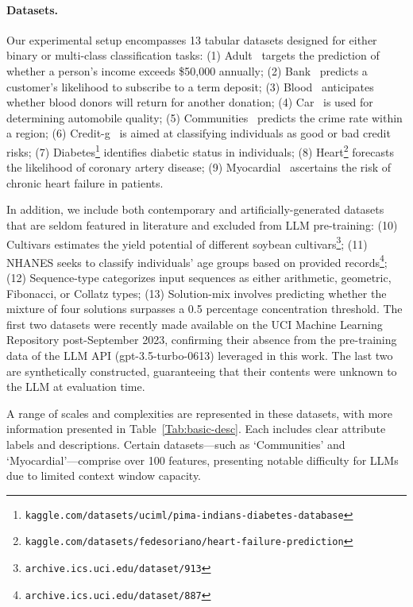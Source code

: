 \paragraph{Datasets.}
Our experimental setup encompasses 13 tabular datasets designed for either binary or multi-class classification tasks: (1) Adult~\cite{asuncion2007uci} targets the prediction of whether a person’s income exceeds \$50,000 annually; (2) Bank~\cite{moro2014data} predicts a customer’s likelihood to subscribe to a term deposit; (3) Blood~\cite{yeh2009knowledge} anticipates whether blood donors will return for another donation; (4) Car~\cite{kadra2021well} is used for determining automobile quality; (5) Communities~\cite{misc_communities_and_crime_183} predicts the crime rate within a region; (6) Credit-g~\cite{kadra2021well} is aimed at classifying individuals as good or bad credit risks; (7) Diabetes\footnote{\texttt{kaggle.com/datasets/uciml/pima-indians-diabetes-database}} identifies diabetic status in individuals; (8) Heart\footnote{\texttt{kaggle.com/datasets/fedesoriano/heart-failure-prediction}} forecasts the likelihood of coronary artery disease; (9) Myocardial~\cite{misc_myocardial_infarction_complications_579} ascertains the risk of chronic heart failure in patients.

In addition, we include both contemporary and artificially-generated datasets that are seldom featured in literature and excluded from LLM pre-training: (10) Cultivars estimates the yield potential of different soybean cultivars\footnote{\texttt{archive.ics.uci.edu/dataset/913}}; (11) NHANES seeks to classify individuals’ age groups based on provided records\footnote{\texttt{archive.ics.uci.edu/dataset/887}}; (12) Sequence-type categorizes input sequences as either arithmetic, geometric, Fibonacci, or Collatz types; (13) Solution-mix involves predicting whether the mixture of four solutions surpasses a 0.5 percentage concentration threshold. The first two datasets were recently made available on the UCI Machine Learning Repository post-September 2023, confirming their absence from the pre-training data of the LLM API (gpt-3.5-turbo-0613) leveraged in this work. The last two are synthetically constructed, guaranteeing that their contents were unknown to the LLM at evaluation time.

A range of scales and complexities are represented in these datasets, with more information presented in Table~\ref{Tab:basic-desc}. Each includes clear attribute labels and descriptions. Certain datasets—such as `Communities' and `Myocardial'—comprise over 100 features, presenting notable difficulty for LLMs due to limited context window capacity.

